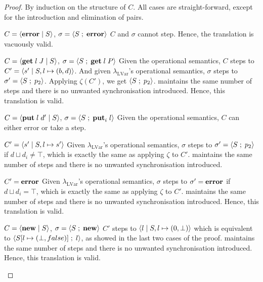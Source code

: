 \documentclass[main.tex]{subfiles}
\begin{document}
\begin{proof}
  By induction on the structure of $C$. All cases are straight-forward, except
  for the introduction and elimination of pairs.

  \begin{case}{%
      $C = \langle {\ensuremath{\mathbf{error}}}\;\vert\;{S} \rangle$,
      $\sigma = \langle {S} \; ; \;{\mathbf{error}} \rangle$}
    $C$ and $\sigma$ cannot step. Hence, the translation is vacuously valid.
  \end{case}

  \begin{case}{%
      $C = \langle {\ensuremath{\mathbf{get}}\;l\;J}\;\vert\;{S} \rangle$,
      $\sigma = \langle {S} \; ; \;{\mathbf{get}\;l\;P} \rangle$}
    Given the operational semantics, $C$ steps to $C' = \langle {s'}\;\vert\;{S, l \mapsto (b, d)} \rangle$. And given $\lambda_{\text{LVar}}$'s operational semantics, $\sigma$ steps to $\sigma' = \langle {S} \; ; \;{p_2} \rangle$. Applying $\zeta (C')$, we get $\langle {S} \; ; \;{p_2} \rangle$. \typedlambdalvar maintains the same number of steps and there is no unwanted synchronisation introduced. Hence, this translation is valid.
  \end{case}

  \begin{case}{%
      $C = \langle {\ensuremath{\mathbf{put}}\;l\;d'}\;\vert\;{S} \rangle$,
      $\sigma = \langle {S} \; ; \;{\mathbf{put}_{i}\;l} \rangle$}
    Given the operational semantics, $C$ can either error or take a step.
    \begin{subcase}{$C' = \langle {s'}\;\vert\;{S, l \mapsto s'} \rangle$}
      Given $\lambda_{\text{LVar}}$'s operational semantics, $\sigma$ steps to $\sigma' = \langle {S} \; ; \;{p_2} \rangle$ if $d \sqcup d_{i} \neq \top$, which is exactly the same as applying $\zeta$ to $C'$. \typedlambdalvar maintains the same number of steps and there is no unwanted synchronisation introduced.
    \end{subcase}
    \begin{subcase}{$C' = \mathbf{error}$}
      Given $\lambda_{\text{LVar}}$'s operational semantics, $\sigma$ steps to $\sigma' = \mathbf{error}$ if $d \sqcup d_{i} = \top$, which is exactly the same as applying $\zeta$ to $C'$. \typedlambdalvar maintains the same number of steps and there is no unwanted synchronisation introduced. Hence, this translation is valid.
    \end{subcase}
  \end{case}

  \begin{case}{%
      $C = \langle {\ensuremath{\mathbf{new}}}\;\vert\;{S} \rangle$,
      $\sigma = \langle {S} \; ; \;{\mathbf{new}} \rangle$}
    $C'$ steps to $\langle {l}\;\vert\;{S, l \mapsto (0, \bot)} \rangle$ which is equivalent to $\langle {S[l \mapsto (\bot, false)]} \; ; \;{l} \rangle$, as showed in the last two cases of the proof. \typedlambdalvar maintains the same number of steps and there is no unwanted synchronisation introduced. Hence, this translation is valid.
  \end{case}


\end{proof}
\end{document}
